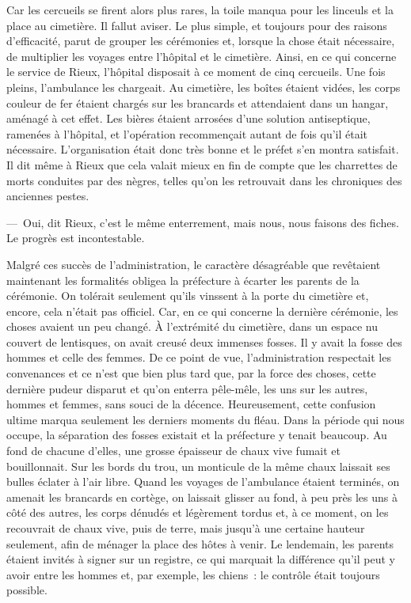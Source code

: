 \documentclass[french,twoside]{book} %
\begin{document}
Car les cercueils se firent alors plus rares, la toile manqua pour les linceuls et la place au cimetière. Il fallut aviser. Le plus simple, et toujours pour des raisons d’efficacité, parut de grouper les cérémonies et, lorsque la chose était nécessaire, de multiplier les voyages entre l’hôpital et le cimetière. Ainsi, en ce qui concerne le service de Rieux, l’hôpital disposait à ce moment de cinq cercueils. Une fois pleins, l’ambulance les chargeait. Au cimetière, les boîtes étaient vidées, les corps couleur de fer étaient chargés sur les brancards et attendaient dans un hangar, aménagé à cet effet. Les bières étaient arrosées d’une solution antiseptique, ramenées à l’hôpital, et l’opération recommençait autant de fois qu’il était nécessaire. L’organisation était donc très bonne et le préfet s’en montra satisfait. Il dit même à Rieux que cela valait mieux en fin de compte que les charrettes de morts conduites par des nègres, telles qu’on les retrouvait dans les chroniques des anciennes pestes.\par
— Oui, dit Rieux, c’est le même enterrement, mais nous, nous faisons des fiches. Le progrès est incontestable.\par
Malgré ces succès de l’administration, le caractère désagréable que revêtaient maintenant les formalités obligea la préfecture à écarter les parents de la cérémonie. On tolérait seulement qu’ils vinssent à la porte du cimetière et, encore, cela n’était pas officiel. Car, en ce qui concerne la dernière cérémonie, les choses avaient un peu changé. À l’extrémité du cimetière, dans un espace nu couvert de lentisques, on avait creusé deux immenses fosses. Il y avait la fosse des hommes et celle des femmes. De ce point de vue, l’administration respectait les convenances et ce n’est que bien plus tard que, par la force des choses, cette dernière pudeur disparut et qu’on enterra pêle-mêle, les uns sur les autres, hommes et femmes, sans souci de la décence. Heureusement, cette confusion ultime marqua seulement les derniers moments du fléau. Dans la période qui nous occupe, la séparation des fosses existait et la préfecture y tenait beaucoup. Au fond de chacune d’elles, une grosse épaisseur de chaux vive fumait et bouillonnait. Sur les bords du trou, un monticule de la même chaux laissait ses bulles éclater à l’air libre. Quand les voyages de l’ambulance étaient terminés, on amenait les brancards en cortège, on laissait glisser au fond, à peu près les uns à côté des autres, les corps dénudés et légèrement tordus et, à ce moment, on les recouvrait de chaux vive, puis de terre, mais jusqu’à une certaine hauteur seulement, afin de ménager la place des hôtes à venir. Le lendemain, les parents étaient invités à signer sur un registre, ce qui marquait la différence qu’il peut y avoir entre les hommes et, par exemple, les chiens : le contrôle était toujours possible.\par
\end{document}
